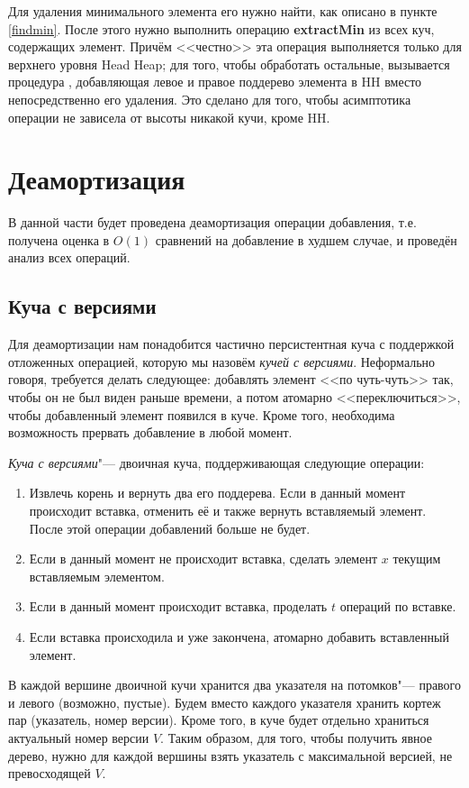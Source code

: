 Для удаления минимального элемента его нужно найти, как описано в пункте \ref{findmin}.
После этого нужно выполнить операцию \textbf{extractMin} из всех куч, содержащих элемент.
Причём <<честно>> эта операция выполняется только для верхнего уровня Head Heap; для
того, чтобы обработать остальные, вызывается процедура \Yield, добавляющая левое
и правое поддерево элемента в HH вместо непосредственно его удаления. Это сделано
для того, чтобы асимптотика операции не зависела от высоты никакой кучи, кроме HH.


\section{Деамортизация}
В данной части будет проведена деамортизация операции добавления, т.е. получена
оценка в $O(1)$ сравнений на добавление в худшем случае, и проведён анализ всех
операций.

\subsection{Куча с версиями}
Для деамортизации нам понадобится частично персистентная куча с поддержкой
отложенных операцией, которую мы назовём \emph{кучей с версиями}.
Неформально говоря, требуется делать следующее: добавлять элемент <<по чуть-чуть>>
так, чтобы он не был виден раньше времени, а потом атомарно <<переключиться>>,
чтобы добавленный элемент появился в куче. Кроме того, необходима возможность
прервать добавление в любой момент.

\begin{definition}
\emph{Куча с версиями}"--- двоичная куча, поддерживающая следующие операции:
\begin{enumerate}
\item Извлечь корень и вернуть два его поддерева. Если в данный момент происходит
    вставка, отменить её и также вернуть вставляемый элемент. После этой операции
    добавлений больше не будет.
\item Если в данный момент не происходит вставка, сделать элемент $x$
    текущим вставляемым элементом.
\item Если в данный момент происходит вставка, проделать $t$ операций по вставке.
\item Если вставка происходила и уже закончена, атомарно добавить вставленный элемент.
\end{enumerate}
\end{definition}

В каждой вершине двоичной кучи хранится два указателя на потомков"--- правого
и левого (возможно, пустые). Будем вместо каждого указателя хранить кортеж
пар (указатель, номер версии). Кроме того, в куче будет отдельно храниться
актуальный номер версии $V$. Таким образом, для того, чтобы получить явное дерево,
нужно для каждой вершины взять указатель с максимальной версией, не превосходящей
$V$.

